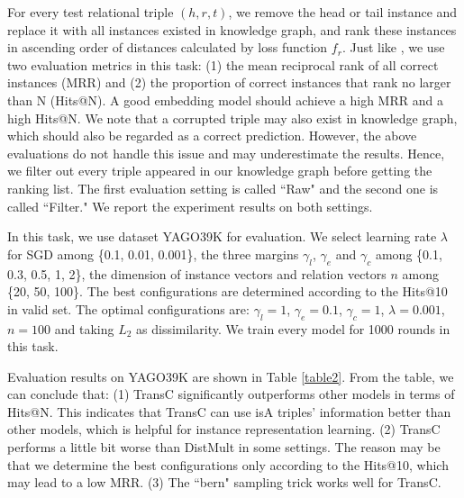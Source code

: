 \documentclass[11pt,a4paper]{article}
\begin{document}
  For every test relational triple $(h, r, t)$, we remove the head or tail instance and replace it
  with all instances existed in knowledge graph, and rank these instances in ascending order of distances calculated by 
  loss function $f_r$. Just like \cite{TransE}, we use two evaluation metrics in this task: (1) the mean reciprocal rank
  of all correct instances (MRR) and (2) the proportion of correct instances that rank no larger than N (Hits@N).
  A good embedding model should achieve a high MRR and a high Hits@N. We note that a corrupted triple may 
  also exist in knowledge graph, which should also be regarded as a correct prediction. However, the above evaluations 
  do not handle this issue and may underestimate the results. Hence, we filter out every triple appeared in our knowledge
  graph before getting the ranking list. The first evaluation setting is called ``Raw" and the second one is called ``Filter."
  We report the experiment results on both settings.
  
  In this task, we use dataset YAGO39K for evaluation. We select 
  learning rate $\lambda$ for SGD among \{0.1, 0.01, 0.001\}, the three margins $\gamma_l$, $\gamma_e$ and $\gamma_c$
  among \{0.1, 0.3, 0.5, 1, 2\}, the dimension of instance vectors and relation vectors $n$ among \{20, 50, 100\}.
  The best configurations are determined according to the Hits@10 in valid set. The optimal configurations are: 
  $\gamma_l = 1$, $\gamma_e = 0.1$, $\gamma_c = 1$, $\lambda = 0.001$, $n = 100$ and taking $L_2$ as dissimilarity.
  We train every model for 1000 rounds in this task.
  
  Evaluation results on YAGO39K are shown in Table \ref{table2}. From the table, we can conclude that: (1) TransC significantly outperforms other
  models in terms of Hits@N. This indicates
  that TransC can use isA triples' information better than other models, which is helpful for instance representation learning.
  (2) TransC performs a little bit worse than DistMult in some settings. 
  The reason may be that we determine the 
  best configurations only according to the Hits@10, which may lead to a low MRR. (3) The ``bern" sampling trick works well for 
  TransC.
  
\end{document}
